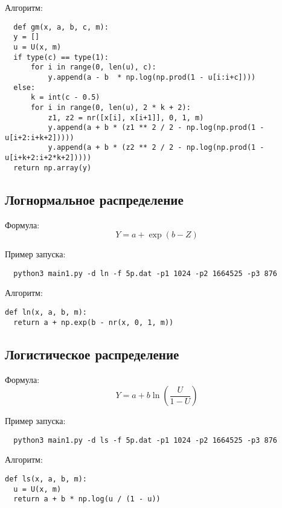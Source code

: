 \documentclass[spec, och, labwork]{shiza}
\begin{document}
Алгоритм:
\begin{small}
\begin{verbatim}
  def gm(x, a, b, c, m):
  y = []
  u = U(x, m)
  if type(c) == type(1):
      for i in range(0, len(u), c):
          y.append(a - b  * np.log(np.prod(1 - u[i:i+c])))
  else:
      k = int(c - 0.5)
      for i in range(0, len(u), 2 * k + 2):
          z1, z2 = nr([x[i], x[i+1]], 0, 1, m)
          y.append(a + b * (z1 ** 2 / 2 - np.log(np.prod(1 - u[i+2:i+k+2]))))
          y.append(a + b * (z2 ** 2 / 2 - np.log(np.prod(1 - u[i+k+2:i+2*k+2]))))
  return np.array(y)
\end{verbatim}
\end{small}


\subsection{Логнормальное распределение}

Формула:
\[ Y = a + \exp(b - Z) \]

Пример запуска:
\begin{small}
\begin{verbatim}
  python3 main1.py -d ln -f 5p.dat -p1 1024 -p2 1664525 -p3 876   
 \end{verbatim}
\end{small}

Алгоритм:
\begin{small}
\begin{verbatim}
def ln(x, a, b, m):
  return a + np.exp(b - nr(x, 0, 1, m))
\end{verbatim}
\end{small}

\subsection{Логистическое распределение}

Формула:
\[ Y = a + b \ln(\frac{U}{1 - U})\]

Пример запуска:
\begin{small}
\begin{verbatim}
  python3 main1.py -d ls -f 5p.dat -p1 1024 -p2 1664525 -p3 876  
 \end{verbatim}
\end{small}

Алгоритм:
\begin{small}
\begin{verbatim}
def ls(x, a, b, m):
  u = U(x, m)
  return a + b * np.log(u / (1 - u))
\end{verbatim}
\end{small}
\end{document}
